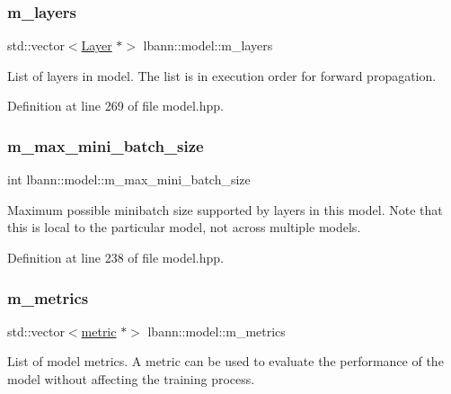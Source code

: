 \subsubsection{\texorpdfstring{m\+\_\+layers}{m\_layers}}
{\footnotesize\ttfamily std\+::vector$<$\hyperlink{classlbann_1_1Layer}{Layer} $\ast$$>$ lbann\+::model\+::m\+\_\+layers\hspace{0.3cm}{\ttfamily [protected]}}

List of layers in model. The list is in execution order for forward propagation. 

Definition at line 269 of file model.\+hpp.

\mbox{\label{classlbann_1_1model_acc496503e7cf8d635e5a31ba09b3c81a}} 
\subsubsection{\texorpdfstring{m\+\_\+max\+\_\+mini\+\_\+batch\+\_\+size}{m\_max\_mini\_batch\_size}}
{\footnotesize\ttfamily int lbann\+::model\+::m\+\_\+max\+\_\+mini\+\_\+batch\+\_\+size\hspace{0.3cm}{\ttfamily [protected]}}

Maximum possible minibatch size supported by layers in this model. Note that this is local to the particular model, not across multiple models. 

Definition at line 238 of file model.\+hpp.

\mbox{\label{classlbann_1_1model_ae75c9aafe9e5a93980cc1bbae986bc79}} 
\subsubsection{\texorpdfstring{m\+\_\+metrics}{m\_metrics}}
{\footnotesize\ttfamily std\+::vector$<$\hyperlink{classlbann_1_1metric}{metric} $\ast$$>$ lbann\+::model\+::m\+\_\+metrics\hspace{0.3cm}{\ttfamily [protected]}}

List of model metrics. A metric can be used to evaluate the performance of the model without affecting the training process. 

